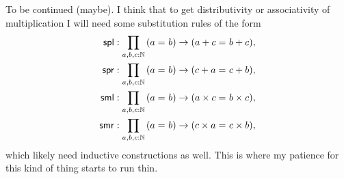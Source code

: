 \documentclass[12pt]{book}
\begin{document}
To be continued (maybe). I think that to get distributivity or associativity of multiplication I will need some substitution rules of the form
\begin{align*}
\mathsf{spl} : \prd{a,b,c:\nat} (\id{a}{b}) \rightarrow (\id{a + c}{b + c}),\\
\mathsf{spr} : \prd{a,b,c:\nat} (\id{a}{b}) \rightarrow (\id{c + a}{c + b}),\\
\mathsf{sml} : \prd{a,b,c:\nat} (\id{a}{b}) \rightarrow (\id{a \times c}{b \times c}),\\
\mathsf{smr} : \prd{a,b,c:\nat} (\id{a}{b}) \rightarrow (\id{c \times a}{c \times b}),
\end{align*}
which likely need inductive constructions as well. This is where my patience for this kind of thing starts to run thin.
\end{document}
